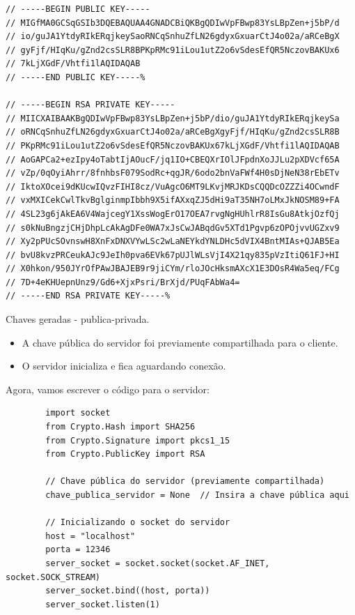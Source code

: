 \documentclass[a4paper,12pt]{article}
\begin{document}
\begin{listing}[!ht]
\begin{verbatim}
// -----BEGIN PUBLIC KEY-----
// MIGfMA0GCSqGSIb3DQEBAQUAA4GNADCBiQKBgQDIwVpFBwp83YsLBpZen+j5bP/d
// io/guJA1YtdyRIkERqjkeySaoRNCqSnhuZfLN26gdyxGxuarCtJ4o02a/aRCeBgX
// gyFjf/HIqKu/gZnd2csSLR8BPKpRMc91iLou1utZ2o6vSdesEfQR5NczovBAKUx6
// 7kLjXGdF/Vhtfi1lAQIDAQAB
// -----END PUBLIC KEY-----%                                                                                                                         

// -----BEGIN RSA PRIVATE KEY-----
// MIICXAIBAAKBgQDIwVpFBwp83YsLBpZen+j5bP/dio/guJA1YtdyRIkERqjkeySa
// oRNCqSnhuZfLN26gdyxGxuarCtJ4o02a/aRCeBgXgyFjf/HIqKu/gZnd2csSLR8B
// PKpRMc91iLou1utZ2o6vSdesEfQR5NczovBAKUx67kLjXGdF/Vhtfi1lAQIDAQAB
// AoGAPCa2+ezIpy4oTabtIjAOucF/jq1IO+CBEQXrIOlJFpdnXoJJLu2pXDVcf65A
// vZp/0qOyiAhrr/8fnhbsF079SodRc+qgJR/6odo2bnVaFWf4H0sDjNeN38rEbETv
// IktoXOcei9dKUcwIQvzFIHI8cz/VuAgcO6MT9LKvjMRJKDsCQQDcOZZZi4OCwndF
// vxMXICekCwlTkvBglginmpIbbh9X5ifAXxqZJ5dHi9aT35NH7oLMxJkNOSM89+FA
// 4SL23g6jAkEA6V4WajcegY1XssWogErO17OEA7rvgNgHUhlrR8IsGu8AtkjOzfQj
// s0kNuBngzjCHjDhpLcAkAgDFe0WA7xJsCwJABqdGv5XTd1Pgvp6zOPOjvvUGZxv9
// Xy2pPUcSOvnswH8XnFxDNXVYwLSc2wLaNEYkdYNLDHc5dVIX4BntMIAs+QJAB5Ea
// bvU8kvzPRCeukAJc9JeIh0pva6EVk67pUJlWLsVjI4X21qy835pVzItiQ61FJ+HI
// X0hkon/950JYrOfPAwJBAJEB9r9jiCYm/rloJOcHksmAXcX1E3DOsR4Wa5eq/FCg
// 7D+4eKHUepnUnz9/Gd6+XjxPsri/BrXjd/PUqFAbWa4=
// -----END RSA PRIVATE KEY-----%

\end{verbatim}
\caption{Chaves geradas - publica-privada.}
\end{listing}

\newpage
\newpage

\begin{itemize}
\item A chave p\'ublica do servidor foi previamente compartilhada para o cliente.
\item O servidor inicializa e fica aguardando conex\~ao.
\end{itemize}

Agora, vamos escrever o c\'odigo para o servidor:

\begin{listing}[!ht]
    \begin{verbatim}
        import socket
        from Crypto.Hash import SHA256
        from Crypto.Signature import pkcs1_15
        from Crypto.PublicKey import RSA

        // Chave pública do servidor (previamente compartilhada)
        chave_publica_servidor = None  // Insira a chave pública aqui

        // Inicializando o socket do servidor
        host = "localhost"
        porta = 12346
        server_socket = socket.socket(socket.AF_INET, socket.SOCK_STREAM)
        server_socket.bind((host, porta))
        server_socket.listen(1)

\end{verbatim}
\end{listing}
\end{document}
